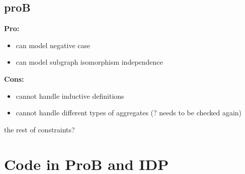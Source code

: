 \documentclass{article}
\theoremstyle{definition}
\begin{document}
\subsection{proB}
\textbf{Pro:}
\begin{itemize}
  \item can model negative case
  \item can model subgraph isomorphism independence
\end{itemize}
\textbf{Cons:}
\begin{itemize}
  \item cannot handle inductive definitions
  \item cannot handle different types of aggregates (? needs to be checked again)
\end{itemize}

the rest of constraints? 

\section{Code in ProB and IDP}

\pagebreak




\end{document}
